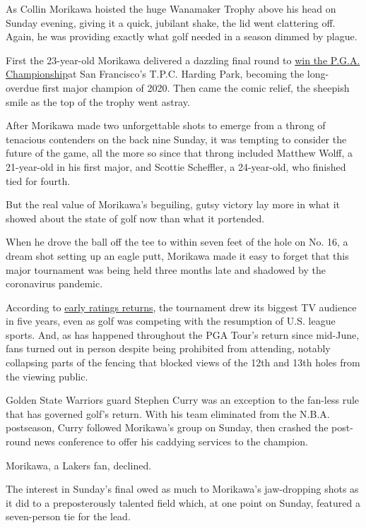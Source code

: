 As Collin Morikawa hoisted the huge Wanamaker Trophy above his head on
Sunday evening, giving it a quick, jubilant shake, the lid went
clattering off. Again, he was providing exactly what golf needed in a
season dimmed by plague.

First the 23-year-old Morikawa delivered a dazzling final round to
\href{https://www.nytimes3xbfgragh.onion/2020/08/09/sports/golf/pga-championship-collin-morikawa.html}{win
the P.G.A. Championship}at San Francisco's T.P.C. Harding Park, becoming
the long-overdue first major champion of 2020. Then came the comic
relief, the sheepish smile as the top of the trophy went astray.

After Morikawa made two unforgettable shots to emerge from a throng of
tenacious contenders on the back nine Sunday, it was tempting to
consider the future of the game, all the more so since that throng
included Matthew Wolff, a 21-year-old in his first major, and Scottie
Scheffler, a 24-year-old, who finished tied for fourth.

But the real value of Morikawa's beguiling, gutsy victory lay more in
what it showed about the state of golf now than what it portended.

When he drove the ball off the tee to within seven feet of the hole on
No. 16, a dream shot setting up an eagle putt, Morikawa made it easy to
forget that this major tournament was being held three months late and
shadowed by the coronavirus pandemic.

According to
\href{https://golfweek.usatoday.com/2020/08/08/golf-on-tv-ratings-espn-cbs-pga-tour/}{early
ratings returns}, the tournament drew its biggest TV audience in five
years, even as golf was competing with the resumption of U.S. league
sports. And, as has happened throughout the PGA Tour's return since
mid-June, fans turned out in person despite being prohibited from
attending, notably collapsing parts of the fencing that blocked views of
the 12th and 13th holes from the viewing public.

Golden State Warriors guard Stephen Curry was an exception to the
fan-less rule that has governed golf's return. With his team eliminated
from the N.B.A. postseason, Curry followed Morikawa's group on Sunday,
then crashed the post-round news conference to offer his caddying
services to the champion.

Morikawa, a Lakers fan, declined.

The interest in Sunday's final owed as much to Morikawa's jaw-dropping
shots as it did to a preposterously talented field which, at one point
on Sunday, featured a seven-person tie for the lead.


